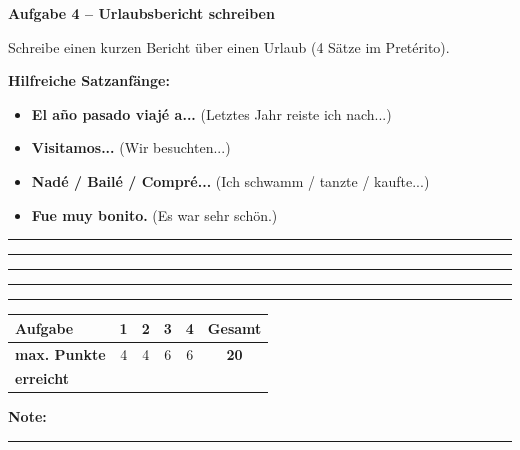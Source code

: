\documentclass[11pt, a4paper]{article}
\newcommand{\fachfarbe}{spanisch}
\newcommand{\punktebox}[1]{\hfill\fbox{\small \_/#1}}
\newcommand{\luecke}[1]{\rule{#1}{0.4pt}}
\newenvironment{aufgabe}[1]{%
    \needspace{5\baselineskip}%
    \nopagebreak[4]%
    \vspace{10pt}
    \noindent\textbf{\textcolor{\fachfarbe}{Aufgabe #1}}
    \nopagebreak[4]%
    \vspace{5pt}
    \nopagebreak[4]%
    \begin{list}{}{\leftmargin=0pt}
    \item[]
}{%
    \end{list}
}
\newcommand{\es}[1]{\textcolor{\fachfarbe}{\textbf{#1}}}
\begin{document}
\vspace{15pt}


\begin{aufgabe}{4 -- Urlaubsbericht schreiben}
Schreibe einen kurzen Bericht über einen Urlaub (4 Sätze im Pretérito). \punktebox{6}
\end{aufgabe}

\textbf{Hilfreiche Satzanfänge:}
\begin{itemize}[nosep]
    \item \es{El año pasado viajé a...} (Letztes Jahr reiste ich nach...)
    \item \es{Visitamos...} (Wir besuchten...)
    \item \es{Nadé / Bailé / Compré...} (Ich schwamm / tanzte / kaufte...)
    \item \es{Fue muy bonito.} (Es war sehr schön.)
\end{itemize}

\vspace{0.5em}

\noindent\rule{\textwidth}{0.4pt}\vspace{8pt}
\noindent\rule{\textwidth}{0.4pt}\vspace{8pt}
\noindent\rule{\textwidth}{0.4pt}\vspace{8pt}
\noindent\rule{\textwidth}{0.4pt}


\vspace{25pt}
\hrule
\vspace{10pt}

\noindent
\begin{tabularx}{\textwidth}{|X|c|c|c|c||c|}
\hline
\textbf{Aufgabe} & 1 & 2 & 3 & 4 & \textbf{Gesamt} \\
\hline
\textbf{max. Punkte} & 4 & 4 & 6 & 6 & \textbf{20} \\
\hline
\textbf{erreicht} & & & & & \\[0.8em]
\hline
\end{tabularx}

\vspace{10pt}

\begin{flushright}
\textbf{Note:} \luecke{2cm}
\end{flushright}
\end{document}
